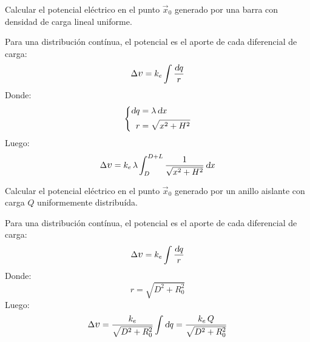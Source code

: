 \begin{mdframed}[style=ExampleFrame]
    \begin{example}
    \end{example}
    \begin{formatI}
        Calcular el potencial eléctrico en el punto $\vec{x}_0$ generado por una barra con densidad de carga lineal uniforme.
    \end{formatI}
    \begin{center}
        \def\svgwidth{\linewidth}
        
    \end{center}
    Para una distribución contínua, el potencial es el aporte de cada diferencial de carga:
    \begin{equation*}
        \Delta \voltage = \cstcoulomb \int \frac{\dif q}{r}
    \end{equation*}
    Donde:
    \begin{equation*}
        \left\{
        \begin{aligned}
            \textsl{d} q &= \lambda \, \textsl{d} x
            \\
            r &= \sqrt{x^2+H^2}
        \end{aligned}
        \right.
    \end{equation*}
    Luego:
    \begin{equation*}
        \Delta \voltage = \cstcoulomb \, \lambda \int_D^{D+L} \frac{1}{\sqrt{x^2+H^2}} \, \dif x
    \end{equation*}
\end{mdframed}

\begin{mdframed}[style=ExampleFrame]
    \begin{example}
    \end{example}
    \begin{formatI}
        Calcular el potencial eléctrico en el punto $\vec{x}_0$ generado por un anillo aislante con carga $Q$ uniformemente distribuída.
    \end{formatI}
    \begin{center}
        \def\svgwidth{\linewidth}
        
    \end{center}
    Para una distribución contínua, el potencial es el aporte de cada diferencial de carga:
    \begin{equation*}
        \Delta \voltage = \cstcoulomb \int \frac{\dif q}{r}
    \end{equation*}
    Donde:
    \begin{equation*}
        r = \sqrt{D^2 + R_0^2}
    \end{equation*}
    Luego:
    \begin{equation*}
        \Delta \voltage = \frac{\cstcoulomb}{\sqrt{D^2 + R_0^2}} \int \dif q = \frac{\cstcoulomb \, Q}{\sqrt{D^2 + R_0^2}}
    \end{equation*}
\end{mdframed}

